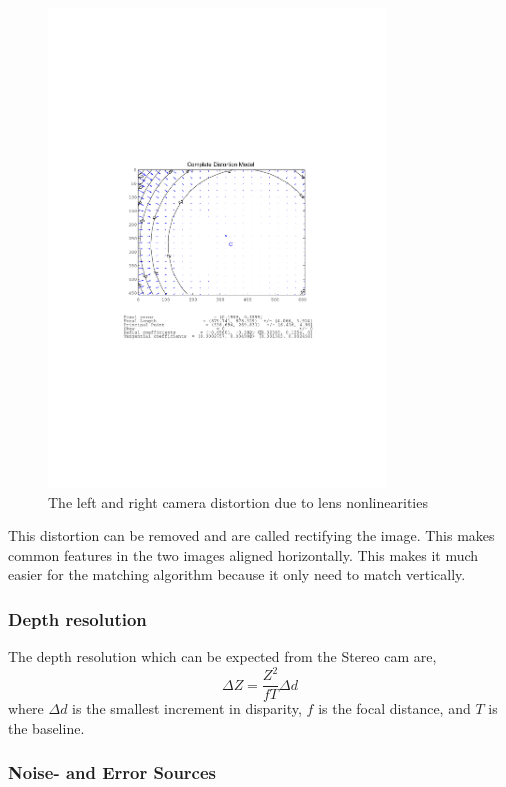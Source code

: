 \begin{figure}[htbp]
    \includegraphics[width=0.8\textwidth]{pics/right_comp_dist}
    \caption{The left and right camera distortion due to lens nonlinearities}
    \label{chap3:fig-lensdist}
\end{figure}

This distortion can be removed and are called rectifying the image. This makes common
features in the two images aligned horizontally. This makes it much easier for the matching
algorithm because it only need to match vertically.


\subsubsection{Depth resolution}
The depth resolution which can be expected from the Stereo cam are,
\begin{equation}
    \Delta Z = \frac{Z^2}{f T}\Delta d
\end{equation}
where $\Delta d$ is the smallest increment in disparity, $f$ is the focal distance, and
$T$ is the baseline.


\subsubsection{Noise- and Error Sources}




